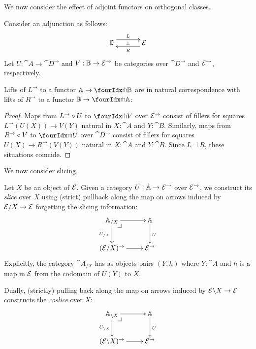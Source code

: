 \documentclass[reqno,10pt,a4paper,oneside]{amsart}
\begin{document}
\medskip

We now consider the effect of adjoint functors on orthogonal classes.

Consider an adjunction as follows:
\[
\xymatrix@C+1em{
  \cat{D}
  \ar@<5pt>[r]^{L}
  \ar@{}[r]|{\bot}
&
  \catE
  \ar@<5pt>[l]^{R}
}
\]
Let $U : \cat{A} \to \cat{D}^{\to}$ and $V : \mathbb{B} \to \mathcal{E}^{\to}$ be categories over $\cat{D}^{\to}$ and $\mathcal{E}^{\to}$, respectively.

\begin{lemma}
\label{lift-of-adjunction}
Lifts of $L^{\to}$ to a functor $\cat{A} \to \liftl{\cat{B}}$ are in natural correspondence with lifts of $R^{\to}$ to a functor $\cat{B} \to \liftr{\cat{A}}$:
\end{lemma}

\begin{proof}
Maps from $L^{\to} \mathbin{\circ} U$ to $\liftl{V}$ over $\mathcal{E}^{\to}$ consist of fillers for squares $L^{\to}(U(X)) \to V(Y)$ natural in $X : \cat{A}$ and $Y : \cat{B}$.
Similarly, maps from $R^{\to} \mathbin{\circ} V$ to $\liftr{U}$ over $\cat{D}^{\to}$ consist of fillers for squares $U(X) \to R^{\to}(V(Y))$ natural in $X : \cat{A}$ and $Y : \cat{B}$.
Since $L \dashv R$, these situations coincide.
\end{proof}

\medskip


We now consider slicing.

Let $X$ be an object of $\mathcal{E}$.
Given a category $U : \mathbb{A} \to \mathcal{E}^{\to}$ over $\mathcal{E}^{\to}$, we construct its \emph{slice} over $X$ using (strict) pullback along the map on arrows induced by $\mathcal{E}/X \to \mathcal{E}$ forgetting the slicing information:
\[
\xymatrix{
  \cat{A}_{/X}
  \ar[r]
  \ar[d]_{U_{/X}}
  \pullback{dr}
&
  \cat{A}
  \ar[d]^{U}
\\
  (\catE/X)^{\to}
  \ar[r]
&
  \catE^{\to}
}
\]
Explicitly, the category $\cat{A}_{/X}$ has as objects pairs $(Y, h)$ where $Y : \cat{A}$ and $h$ is a map in $\mathcal{E}$ from the codomain of $U(Y)$ to $X$.

Dually, (strictly) pulling back along the map on arrows induced by $\mathcal{E} \backslash X \to \mathcal{E}$ constructs the \emph{coslice} over $X$:
\[
\xymatrix{
  \cat{A}_{\backslash X}
  \ar[r]
  \ar[d]_{U_{\backslash X}}
  \pullback{dr}
&
  \cat{A}
  \ar[d]^{U}
\\
  (\catE \backslash X)^{\to}
  \ar[r]
&
  \catE^{\to}
}
\]
\end{document}
